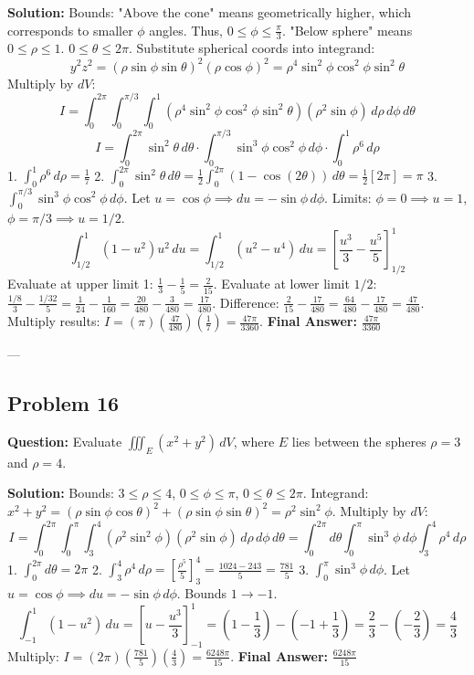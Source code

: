 \documentclass[12pt]{article}
\begin{document}
\textbf{Solution:}
Bounds: "Above the cone" means geometrically higher, which corresponds to smaller $\phi$ angles. Thus, $0 \le \phi \le \frac{\pi}{3}$. "Below sphere" means $0 \le \rho \le 1$. $0 \le \theta \le 2\pi$.
Substitute spherical coords into integrand:
\[ y^2 z^2 = (\rho \sin\phi \sin\theta)^2 (\rho \cos\phi)^2 = \rho^4 \sin^2\phi \cos^2\phi \sin^2\theta \]
Multiply by $dV$:
\[ I = \int_0^{2\pi} \int_0^{\pi/3} \int_0^1 \left(\rho^4 \sin^2\phi \cos^2\phi \sin^2\theta\right) (\rho^2 \sin\phi) \, d\rho \, d\phi \, d\theta \]
\[ I = \int_0^{2\pi} \sin^2\theta \, d\theta \cdot \int_0^{\pi/3} \sin^3\phi \cos^2\phi \, d\phi \cdot \int_0^1 \rho^6 \, d\rho \]
1. $\int_0^1 \rho^6 \, d\rho = \frac{1}{7}$
2. $\int_0^{2\pi} \sin^2\theta \, d\theta = \frac{1}{2} \int_0^{2\pi} (1-\cos(2\theta)) \, d\theta = \frac{1}{2} [2\pi] = \pi$
3. $\int_0^{\pi/3} \sin^3\phi \cos^2\phi \, d\phi$. Let $u = \cos\phi \implies du = -\sin\phi \, d\phi$.
Limits: $\phi=0 \implies u=1$, $\phi=\pi/3 \implies u=1/2$.
\[ \int_{1/2}^1 (1-u^2)u^2 \, du = \int_{1/2}^1 (u^2 - u^4) \, du = \left[ \frac{u^3}{3} - \frac{u^5}{5} \right]_{1/2}^1 \]
Evaluate at upper limit 1: $\frac{1}{3} - \frac{1}{5} = \frac{2}{15}$.
Evaluate at lower limit $1/2$: $\frac{1/8}{3} - \frac{1/32}{5} = \frac{1}{24} - \frac{1}{160} = \frac{20}{480} - \frac{3}{480} = \frac{17}{480}$.
Difference: $\frac{2}{15} - \frac{17}{480} = \frac{64}{480} - \frac{17}{480} = \frac{47}{480}$.
Multiply results: $I = (\pi) \left(\frac{47}{480}\right) \left(\frac{1}{7}\right) = \frac{47\pi}{3360}$.
\textbf{Final Answer:} $\frac{47\pi}{3360}$

---

\subsection*{Problem 16}
\textbf{Question:} Evaluate $\iiint_E (x^2+y^2) \, dV$, where $E$ lies between the spheres $\rho=3$ and $\rho=4$.

\textbf{Solution:}
Bounds: $3 \le \rho \le 4$, $0 \le \phi \le \pi$, $0 \le \theta \le 2\pi$.
Integrand: $x^2+y^2 = (\rho\sin\phi\cos\theta)^2 + (\rho\sin\phi\sin\theta)^2 = \rho^2 \sin^2\phi$.
Multiply by $dV$:
\[ I = \int_0^{2\pi} \int_0^\pi \int_3^4 (\rho^2 \sin^2\phi) (\rho^2 \sin\phi) \, d\rho \, d\phi \, d\theta = \int_0^{2\pi} d\theta \int_0^\pi \sin^3\phi \, d\phi \int_3^4 \rho^4 \, d\rho \]
1. $\int_0^{2\pi} d\theta = 2\pi$
2. $\int_3^4 \rho^4 \, d\rho = \left[ \frac{\rho^5}{5} \right]_3^4 = \frac{1024 - 243}{5} = \frac{781}{5}$
3. $\int_0^\pi \sin^3\phi \, d\phi$. Let $u=\cos\phi \implies du=-\sin\phi \, d\phi$. Bounds $1 \to -1$.
\[ \int_{-1}^1 (1-u^2) \, du = \left[ u - \frac{u^3}{3} \right]_{-1}^1 = \left(1 - \frac{1}{3}\right) - \left(-1 + \frac{1}{3}\right) = \frac{2}{3} - \left(-\frac{2}{3}\right) = \frac{4}{3} \]
Multiply: $I = (2\pi) \left(\frac{781}{5}\right) \left(\frac{4}{3}\right) = \frac{6248\pi}{15}$.
\textbf{Final Answer:} $\frac{6248\pi}{15}$
\end{document}
